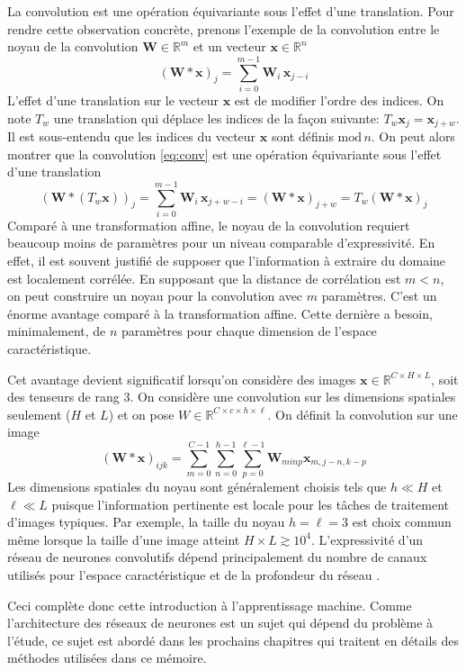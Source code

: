 La convolution est une opération équivariante sous l'effet d'une translation. 
Pour rendre cette observation concrète, prenons l'exemple de la convolution entre le noyau de la convolution $\mathbf{W} \in \mathbb{R}^{m}$ 
et un vecteur $\mathbf{x} \in \mathbb{R}^{n}$
\begin{equation}\label{eq:conv}
        (\mathbf{W} * \mathbf{x})_j = \sum_{i = 0}^{m-1} \mathbf{W}_i\, \mathbf{x}_{j - i}
\end{equation} 
L'effet d'une translation sur le vecteur $\mathbf{x}$ est de modifier l'ordre des indices. On note $T_{w}$ une translation 
qui déplace les indices de la façon suivante: $T_w\mathbf{x}_{j} = \mathbf{x}_{j+w}$. 
Il est sous-entendu que les indices du vecteur $\mathbf{x}$ sont définis $\mathrm{mod}\, n$. 
On peut alors montrer que la convolution \eqref{eq:conv} est une opération équivariante sous l'effet d'une translation 
\begin{equation}
        (\mathbf{W} *(T_w\mathbf{x}))_j = \sum_{i = 0}^{m-1} \mathbf{W}_i\, \mathbf{x}_{j + w - i} = (\mathbf{W} * \mathbf{x})_{j + w} = T_w(\mathbf{W} * \mathbf{x})_{j}
\end{equation} 
Comparé à une transformation affine, le noyau de la convolution requiert beaucoup moins de paramètres pour un niveau comparable d'expressivité. En effet, 
il est souvent justifié de supposer que l'information à extraire du domaine est localement corrélée. 
En supposant que la distance de corrélation est $m< n$, on peut construire un noyau pour la convolution avec $m$ paramètres. C'est un énorme  
avantage comparé à la transformation affine. Cette dernière a besoin, minimalement, de $n$ paramètres pour chaque dimension 
de l'espace caractéristique.

Cet avantage devient significatif lorsqu'on considère des images $\mathbf{x} \in \mathbb{R}^{C \times H\times L}$, soit des tenseurs de rang 3. 
On considère une convolution sur les dimensions spatiales seulement ($H$ et $L$) et on pose ${W \in \mathbb{R}^{C \times c \times h \times \ell }}$. On définit la convolution sur une image 
\begin{equation}
        (\mathbf{W} * \mathbf{x})_{ijk} = \sum_{m=0}^{C-1} \sum_{n=0}^{h-1}\sum_{p=0}^{\ell-1}\mathbf{W}_{minp} \mathbf{x}_{m,j-n,k-p}
\end{equation} 
Les dimensions spatiales du noyau sont généralement choisis tels que $h \ll H$ et $\ell \ll L$ 
puisque l'information pertinente est locale pour les tâches de traitement d'images typiques. Par 
exemple, la taille du noyau $h = \ell = 3 $ est choix commun même lorsque la taille d'une image atteint $H \times L \gtrsim 10^4$. 
L'expressivité d'un réseau de neurones convolutifs \citep{LeCun1995} dépend principalement du nombre de canaux utilisés pour l'espace caractéristique 
et de la profondeur du réseau \citep{Krizhevsky2012}.

Ceci complète donc cette introduction à l'apprentissage machine. Comme l'architecture des réseaux 
de neurones est un sujet qui dépend du problème à l'étude, ce sujet est abordé dans 
les prochains chapitres qui traitent en détails des méthodes utilisées dans ce mémoire.

